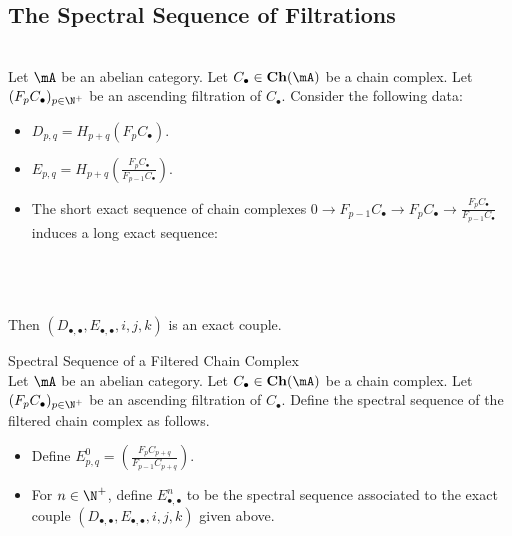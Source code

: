 \documentclass[a4paper]{article}
\begin{document}
\subsection{The Spectral Sequence of Filtrations}
\begin{lmm}{}{}\\
Let $\mA$ be an abelian category. Let $C_\bullet\in\bold{Ch}(\mA)$ be a chain complex. Let $(F_pC_\bullet)_{p\in\N^+}$ be an ascending filtration of $C_\bullet$. Consider the following data: 
\begin{itemize}
\item $D_{p,q}=H_{p+q}(F_pC_\bullet)$. 
\item $E_{p,q}=H_{p+q}\left(\frac{F_pC_\bullet}{F_{p-1}C_\bullet}\right)$. 
\item The short exact sequence of chain complexes $0\to F_{p-1}C_\bullet\to F_pC_\bullet\to\frac{F_pC_\bullet}{F_{p-1}C_\bullet}$ induces a long exact sequence: \\~\\
\\~\\
\end{itemize}
Then $(D_{\bullet,\bullet},E_{\bullet,\bullet},i,j,k)$ is an exact couple. 
\end{lmm}

\begin{defn}{Spectral Sequence of a Filtered Chain Complex}{}\\
Let $\mA$ be an abelian category. Let $C_\bullet\in\bold{Ch}(\mA)$ be a chain complex. Let $(F_pC_\bullet)_{p\in\N^+}$ be an ascending filtration of $C_\bullet$. Define the spectral sequence of the filtered chain complex as follows. 
\begin{itemize}
\item Define $E_{p,q}^0=\left(\frac{F_pC_{p+q}}{F_{p-1}C_{p+q}}\right)$. 
\item For $n\in\N^+$, define $E_{\bullet,\bullet}^n$ to be the spectral sequence associated to the exact couple $(D_{\bullet,\bullet},E_{\bullet,\bullet},i,j,k)$ given above. 
\end{itemize}
\end{defn}
\end{document}
